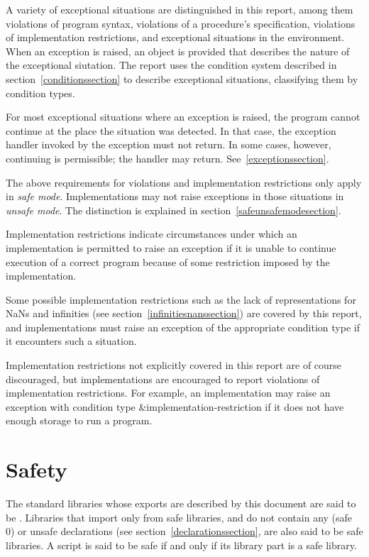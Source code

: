 A variety of exceptional situations
are distinguished in this report, among them violations of program
syntax, violations of a procedure's specification, violations of
implementation restrictions, and exceptional situations in the
environment.  When an exception is raised, an object is provided that
describes the nature of the exceptional siutation.  The report uses
the condition system described in section~\ref{conditionssection} to
describe exceptional situations, classifying them by condition types.

For most exceptional situations where an exception is raised, the
program cannot continue at the place the situation was detected.  In
that case, the exception handler invoked by the exception must not
return.  In some cases, however, continuing is permissible; the
handler may return.  See~\ref{exceptionssection}.

The above requirements for violations and implementation restrictions
only apply in \textit{safe mode}.  Implementations may not raise
exceptions in those situations in \textit{unsafe mode}.  The
distinction is explained in section~\ref{safeunsafemodesection}.

Implementation restrictions indicate circumstances under which an
implementation is permitted to raise an exception if it is unable to
continue execution of a correct program because of some restriction
imposed by the implementation.

Some possible implementation restrictions
such as the lack of representations for NaNs and infinities (see
section~\ref{infinitiesnanssection}) are covered by this report, and
implementations must raise an exception of the appropriate condition
type if it encounters such a situation.

Implementation restrictions not explicitly covered in this report are
of course discouraged, but implementations are encouraged to report
violations of implementation restrictions. For example, an implementation may raise an exception
with condition type {\cf\&implementation-restriction} if it does not
have enough storage to run a program.


\section{Safety}

The standard libraries whose exports are described by this document
are said to be .  Libraries that import only
from safe libraries, and do not contain any {\cf (safe 0)} or {\cf
  unsafe} declarations (see section~\ref{declarationssection}, are
also said to be safe libraries.  A script is said to be safe if and
only if its library part is a safe library.

